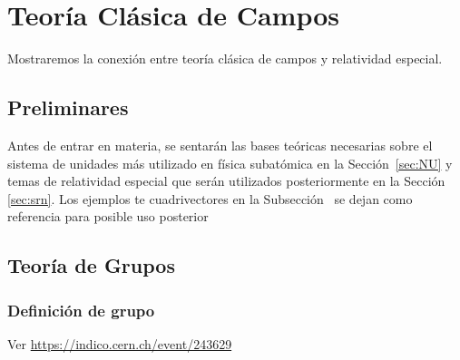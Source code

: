 \chapter{Teoría Clásica de Campos}
\label{chap:tcc} %
Mostraremos la conexión entre teoría clásica de campos y relatividad
especial.  

\section{Preliminares}
Antes de entrar en materia, se sentarán las bases teóricas necesarias sobre el sistema de unidades  más utilizado en física subatómica en la Sección~\ref{sec:NU} y temas de relatividad especial que serán utilizados posteriormente en la Sección \ref{sec:srn}. Los ejemplos te cuadrivectores en la Subsección~ se dejan como referencia para posible uso posterior

\section{Teoría de Grupos}

\subsection{Definición de grupo}
Ver \url{https://indico.cern.ch/event/243629}

